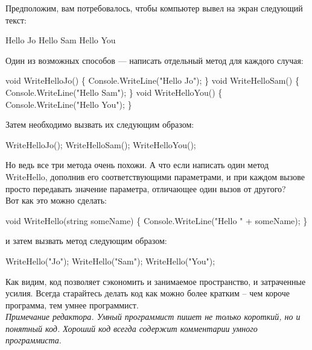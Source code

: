 \documentclass[12pt, a4paper]{article}
\begin{document}
Предположим, вам потребовалось, чтобы компьютер вывел на экран следующий текст:\\

\begin{spverbatim}Hello Jo
Hello Sam
Hello You\end{spverbatim}

Один из возможных способов — написать отдельный метод для каждого случая:\\

\begin{spverbatim}void WriteHelloJo()
\{
    Console.WriteLine("Hello Jo");
\}
void WriteHelloSam()
\{
    Console.WriteLine("Hello Sam");
\}
void WriteHelloYou()
\{
    Console.WriteLine("Hello You");
\}\end{spverbatim}

Затем необходимо вызвать их следующим образом:\\

\begin{spverbatim}WriteHelloJo();
WriteHelloSam();
WriteHelloYou();\end{spverbatim}

Но ведь все три метода очень похожи. А что если написать один метод WriteHello, дополнив его соответствующими параметрами, и при каждом вызове просто передавать значение параметра, отличающее один вызов от другого?\\

Вот как это можно сделать:\\

\begin{spverbatim}void WriteHello(string someName)
\{
    Console.WriteLine("Hello " + someName);
\}\end{spverbatim}

и затем вызвать метод следующим образом:\\

\begin{spverbatim}WriteHello("Jo");
WriteHello("Sam");
WriteHello("You");\end{spverbatim}

Как видим, код позволяет сэкономить и занимаемое пространство, и затраченные усилия. Всегда старайтесь делать код как можно более кратким – чем короче программа, тем умнее программист.\\


\textit{Примечание редактора. Умный программист пишет не только короткий, но и понятный код. Хороший код всегда содержит комментарии умного программиста}.
\end{document}

